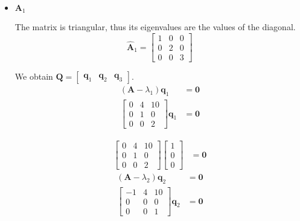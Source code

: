\begin{itemize}
 \item $\mathbf{A}_1$

 The matrix is triangular, thus its eigenvalues are the values
 of the diagonal.
 \begin{equation*}
  \hat{\mathbf{A}}_1 = \begin{bmatrix}
                        1 & 0 &0\\0 & 2 & 0\\0 & 0&3
                       \end{bmatrix}
 \end{equation*}

We obtain $\mathbf{Q} = \begin{bmatrix}
                         \mathbf{q}_1 &\mathbf{q}_2 &\mathbf{q}_3
                        \end{bmatrix}
$.
\begin{align*}
 (\mathbf{A}-\lambda_1) \mathbf{q}_1 &= \mathbf{0}\\
 \begin{bmatrix}
    0 & 4 & 10 \\
     0 & 1 & 0 \\
    0 & 0 & 2
    \end{bmatrix}\mathbf{q}_1 &= \mathbf{0}
\end{align*}

\begin{align*}
  \begin{bmatrix}
    0 & 4 & 10 \\
     0 & 1 & 0 \\
    0 & 0 & 2
    \end{bmatrix}
    \begin{bmatrix}
     1 \\ 0 \\ 0
    \end{bmatrix}
    &= \mathbf{0}
\end{align*}
\begin{align*}
 (\mathbf{A}-\lambda_2) \mathbf{q}_2 &= \mathbf{0}\\
 \begin{bmatrix}
    -1 & 4 & 10 \\
     0 & 0 & 0 \\
    0 & 0 & 1
    \end{bmatrix}\mathbf{q}_2 &= \mathbf{0}
\end{align*}


\end{itemize}

